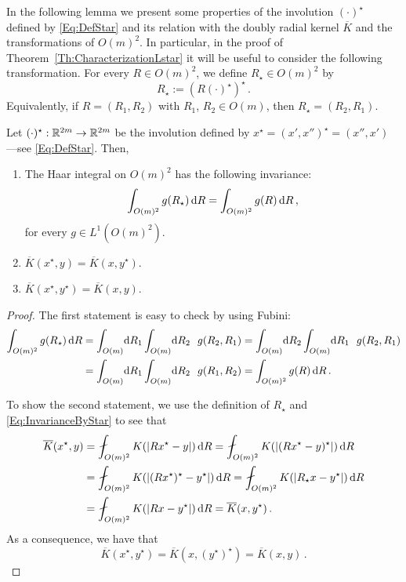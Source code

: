 In the following lemma we present some properties of the involution $(\cdot)^\star$ defined by \eqref{Eq:DefStar} and its relation with the doubly radial kernel $\overline{K}$ and the transformations of $O(m)^2$. In particular, in the proof of Theorem~\ref{Th:CharacterizationLstar} it will be useful to consider the following transformation. For every $R\in O(m)^2$, we define  $R_\star\in O(m)^2$ by 
\begin{equation}
	\label{Eq:DefRStar}
	R_\star := (R(\cdot)^\star)^\star\,.
\end{equation}
Equivalently, if $R = (R_1, R_2)$ with $R_1$, $R_2 \in O(m)$, then $R_\star = (R_2, R_1)$.

\begin{lemma}
\label{Lemma:PropertiesStar}
Let $(\cdot)^\star: \mathbb{R}^{2m} \to \mathbb{R}^{2m}$ be the involution defined by $x^\star = (x',x'')^\star = (x'', x')$
---see \eqref{Eq:DefStar}.
Then,
\begin{enumerate}
\item
The Haar integral on $O(m)^2$ has the following invariance:
\begin{equation}
\label{Eq:InvarianceByStar}
\int_{O(m)^2} g(R_\star) \,\mathrm{d} R = \int_{O(m)^2} g(R) \,\mathrm{d} R \,,
\end{equation}
for every $g \in L^1(O(m)^2)$.
\item $\overline{K}(x^\star,y) = \overline{K} (x,y^\star)$.
\item $\overline{K}(x^\star,y^\star) = \overline{K} (x,y)$.
\end{enumerate}
\end{lemma}

\begin{proof}
The first statement is easy to check by using Fubini:
\begin{align*}
\int_{O(m)^2} g(R_\star) \d R & = \int_{O(m)} \!\! \d R_1 \int_{O(m)} \!\! \d R_2 \ \ g(R_2, R_1)  =  \int_{O(m)} \!\! \d R_2 \int_{O(m)} \!\! \d R_1 \ \ g(R_2, R_1) \\
& =  \int_{O(m)} \!\! \d R_1 \int_{O(m)} \!\! \d R_2 \ \ g(R_1, R_2)  =  \int_{O(m)^2} g(R) \d R\,.
\end{align*}

To show the second statement, we use the definition of $R_\star$ and \eqref{Eq:InvarianceByStar}
to see that
\begin{align*}
\overline{K}(x^\star,y) &= \average_{O(m)^2} K(|Rx^\star - y|) \d R = \average_{O(m)^2} K(|(Rx^\star - y)^\star|) \d R \\
&= \average_{O(m)^2} K(|(R x^\star)^\star - y^\star|) \d R = \average_{O(m)^2} K(|R_\star x - y^\star|) \d R \\
&= \average_{O(m)^2} K(|Rx - y^\star|) \d R = \overline{K}(x,y^\star)\,.
\end{align*}
As a consequence, we have that
$$\overline{K}(x^\star,y^\star) = \overline{K}(x,(y^\star)^\star) = \overline{K}(x,y)\,.$$
\end{proof}

